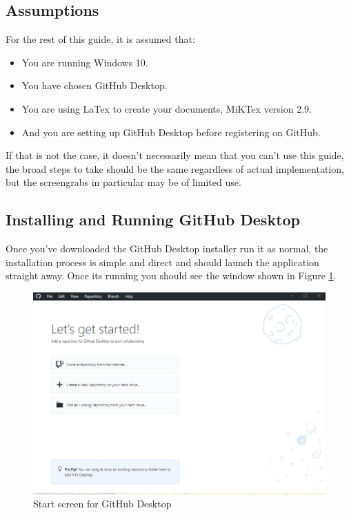 \documentclass[a4paper, 12pt]{article}
\begin{document}
\subsection{Assumptions}
For the rest of this guide, it is assumed that:
\begin{itemize}
\item You are running Windows 10.
\item You have chosen GitHub Desktop.
\item You are using LaTex to create your documents, MiKTex version 2.9.
\item And you are setting up GitHub Desktop before registering on GitHub.
\end{itemize}
If that is not the case, it doesn't necessarily mean that you can't use this guide, the broad steps to take should be the same regardless of actual implementation, but the screengrabs in particular may be of limited use.

\subsection{Installing and Running GitHub Desktop}
Once you've downloaded the GitHub Desktop installer run it as normal, the installation process is simple and direct and should launch the application straight away. Once its running you should see the window shown in Figure \ref{startscreen}.

\begin{figure}
\centering
\includegraphics[width=\linewidth]{startscreen}
\caption{Start screen for GitHub Desktop}
\label{startscreen}
\end{figure}
\end{document}
